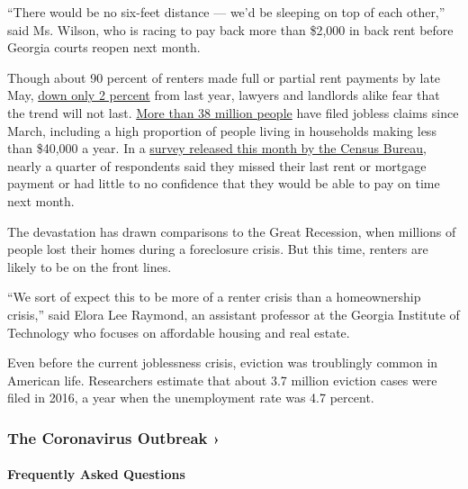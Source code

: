 ``There would be no six-feet distance --- we'd be sleeping on top of
each other,'' said Ms. Wilson, who is racing to pay back more than
\$2,000 in back rent before Georgia courts reopen next month.

Though about 90 percent of renters made full or partial rent payments by
late May,
\href{https://www.nmhc.org/research-insight/nmhc-rent-payment-tracker/}{down
only 2 percent} from last year, lawyers and landlords alike fear that
the trend will not last.
\href{https://www.nytimes3xbfgragh.onion/2020/05/21/business/economy/coronavirus-unemployment-claims.html?action=click\&module=RelatedLinks\&pgtype=Article}{More
than 38 million people} have filed jobless claims since March, including
a high proportion of people living in households making less than
\$40,000 a year. In a
\href{https://www.census.gov/data-tools/demo/hhp/\#/table?measures=HIR}{survey
released this month by the Census Bureau}, nearly a quarter of
respondents said they missed their last rent or mortgage payment or had
little to no confidence that they would be able to pay on time next
month.

The devastation has drawn comparisons to the Great Recession, when
millions of people lost their homes during a foreclosure crisis. But
this time, renters are likely to be on the front lines.

``We sort of expect this to be more of a renter crisis than a
homeownership crisis,'' said Elora Lee Raymond, an assistant professor
at the Georgia Institute of Technology who focuses on affordable housing
and real estate.

Even before the current joblessness crisis, eviction was troublingly
common in American life. Researchers estimate that about 3.7 million
eviction cases were filed in 2016, a year when the unemployment rate was
4.7 percent.

\href{https://www.nytimes3xbfgragh.onion/news-event/coronavirus?action=click\&pgtype=Article\&state=default\&region=MAIN_CONTENT_3\&context=storylines_faq}{}

\hypertarget{the-coronavirus-outbreak-}{%
\subsubsection{The Coronavirus Outbreak
›}\label{the-coronavirus-outbreak-}}

\hypertarget{frequently-asked-questions}{%
\paragraph{Frequently Asked
Questions}\label{frequently-asked-questions}}

